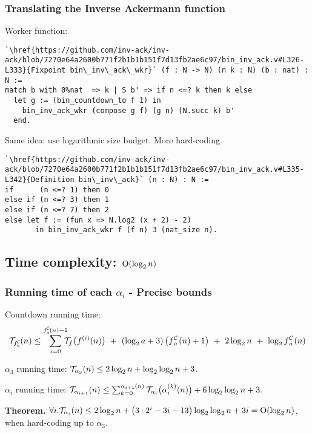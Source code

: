 \begin{frame}[fragile]
\frametitle{Translating the Inverse Ackermann function}

Worker function:

\begin{lstlisting}
`\href{https://github.com/inv-ack/inv-ack/blob/7270e64a2600b771f2b1b1b151f7d13fb2ae6c97/bin_inv_ack.v#L326-L333}{Fixpoint bin\_inv\_ack\_wkr}` (f : N -> N) (n k : N) (b : nat) : N :=
match b with 0%nat  => k | S b' => if n <=? k then k else
  let g := (bin_countdown_to f 1) in
    bin_inv_ack_wkr (compose g f) (g n) (N.succ k) b'
  end.
\end{lstlisting}


Same idea: use logarithmic size budget. More hard-coding.

\begin{lstlisting}
`\href{https://github.com/inv-ack/inv-ack/blob/7270e64a2600b771f2b1b1b151f7d13fb2ae6c97/bin_inv_ack.v#L335-L342}{Definition bin\_inv\_ack}` (n : N) : N :=
if      (n <=? 1) then 0
else if (n <=? 3) then 1
else if (n <=? 7) then 2
else let f := (fun x => N.log2 (x + 2) - 2)
       in bin_inv_ack_wkr f (f n) 3 (nat_size n).
\end{lstlisting}

\end{frame}


\subsection{Time complexity: $\text{O} (\log_2n)$}


\begin{frame}
\frametitle{Running time of each $\alpha_i$ - Precise bounds}

Countdown running time:
\begin{equation*}
\runtime_{\cdt{f}{a}}(n) \le \sum_{i=0}^{\cdt{f}{a}(n) - 1} \hspace{-6pt}
\runtime_f\big(f^{(i)}(n)\big) \ + \ (\log_2a + 3)\left(\cdt{f}{a}(n) + 1\right) \ + \ 2\log_2n \ + \ \log_2\cdt{f}{a}(n)
\end{equation*}

$\alpha_3$ running time: $\mathcal{T}_{\alpha_3}(n) \le 2\log_2n + \log_2\log_2n + 3$.

\bigskip

$\alpha_i$ running time:
$
\mathcal{T}_{\alpha_{i+1}}(n) \le
\sum_{k=0}^{\alpha_{i+1}(n)}\mathcal{T}_{\alpha_i}\big(\alpha_i^{(k)}(n)\big)
+ 6\log_2\log_2n + 3.
$

\bigskip

\textbf{Theorem.} $\forall i. \mathcal{T}_{\alpha_i}(n) \le 2\log_2n + \left(3\cdot 2^i - 3i - 13\right)\log_2\log_2n + 3i = \text{O}(\log_2n)$, when hard-coding up to $\alpha_3$.

\end{frame}



